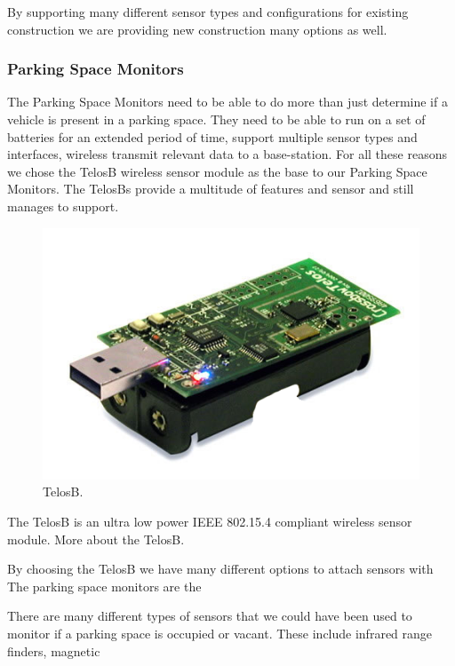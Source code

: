 \documentclass{acm_proc}
\begin{document}
By supporting many different sensor types and configurations for existing construction we are providing new construction many options as well.

\subsubsection{Parking Space Monitors}

The Parking Space Monitors need to be able to do more than just determine if a vehicle is present in a parking space.  They need to be able to run on a set of batteries for an extended period of time, support multiple sensor types and interfaces, wireless transmit relevant data to a base-station.  For all these reasons we chose the TelosB wireless sensor module as the base to our Parking Space Monitors.  The TelosBs provide a multitude of features and sensor and still manages to support.

\begin{figure}[h]
    \begin{center}
		\includegraphics[width=\columnwidth]{figures/telosb}
	\end{center}
	\caption{TelosB.}
	\label{fig:telosb}
\end{figure}

The TelosB is an ultra low power IEEE 802.15.4 compliant wireless sensor module.  More about the TelosB.

By choosing the TelosB we have many different options to attach sensors with
The parking space monitors are the 

There are many different types of sensors that we could have been used to monitor if a parking space is occupied or vacant.  These include infrared range finders, magnetic
\end{document}
